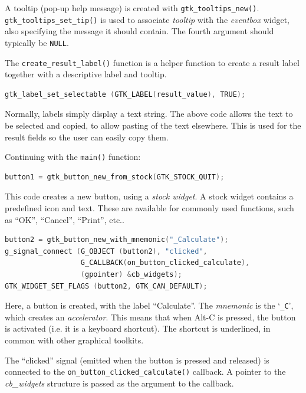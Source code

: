 \documentclass[a4paper,oneside]{article}
\newcommand{\variable}[1]{\textsl{#1}}
\newcommand{\function}[1]{\texttt{#1()}}
\newcommand{\code}[1]{\texttt{#1}}
\begin{document}
A tooltip (pop-up help message) is created with
\function{gtk\_tooltips\_new}.  \function{gtk\_tooltips\_set\_tip} is
used to associate \variable{tooltip} with the \variable{eventbox}
widget, also specifying the message it should contain.  The fourth
argument should typically be \code{NULL}.

The \function{create\_result\_label} function is a helper function to
create a result label together with a descriptive label and tooltip.

\begin{lstlisting}[numbers=none, language=C]
gtk_label_set_selectable (GTK_LABEL(result_value), TRUE);
\end{lstlisting}

Normally, labels simply display a text string.  The above code allows
the text to be selected and copied, to allow pasting of the text
elsewhere.  This is used for the result fields so the user can easily
copy them.

Continuing with the \function{main} function:

\begin{lstlisting}[numbers=none, language=C]
button1 = gtk_button_new_from_stock(GTK_STOCK_QUIT);
\end{lstlisting}

This code creates a new button, using a \emph{stock widget}.  A stock
widget contains a predefined icon and text.  These are available for
commonly used functions, such as ``OK'', ``Cancel'', ``Print'', etc..

\begin{lstlisting}[numbers=none, language=C]
button2 = gtk_button_new_with_mnemonic("_Calculate");
g_signal_connect (G_OBJECT (button2), "clicked",
                  G_CALLBACK(on_button_clicked_calculate),
                  (gpointer) &cb_widgets);
GTK_WIDGET_SET_FLAGS (button2, GTK_CAN_DEFAULT);
\end{lstlisting}

Here, a button is created, with the label ``Calculate''.  The
\emph{mnemonic} is the `\code{\_C}', which creates an
\emph{accelerator}.  This means that when Alt-C is pressed, the button
is activated (i.e. it is a keyboard shortcut).  The shortcut is
underlined, in common with other graphical toolkits.

The ``clicked'' signal (emitted when the button is pressed and
released) is connected to the \function{on\_button\_clicked\_calculate}
callback.  A pointer to the \variable{cb\_widgets} structure is passed
as the argument to the callback.
\end{document}
